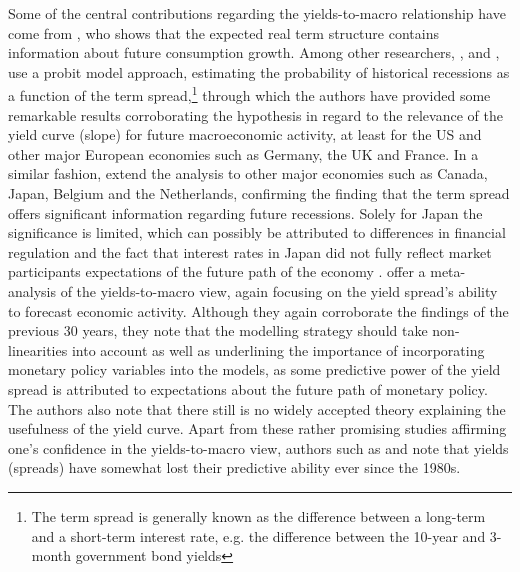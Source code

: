 Some of the central contributions regarding the yields-to-macro relationship have come from \citet{harvey1988real}, who shows that the expected real term structure contains information about future consumption growth.
Among other researchers, \citet{estrella1991term}, \citet{estrella1995term} and \citet{estrella1996yield}, use a probit model approach, estimating the probability of historical recessions as a function of the term spread,\footnote{The term spread is generally known as the difference between a long-term and a short-term interest rate, e.g. the difference between the 10-year and 3-month government bond yields} through which the authors have provided some remarkable results corroborating the hypothesis in regard to the relevance of the yield curve (slope) for future macroeconomic activity, at least for the US and other major European economies such as Germany, the UK and France.
In a similar fashion, \citet{bernard1996} extend the analysis to other major economies such as Canada, Japan, Belgium and the Netherlands, confirming the finding that the term spread offers significant information regarding future recessions. 
Solely for Japan the significance is limited, which can possibly be attributed to differences in financial regulation and the fact that interest rates in Japan did not fully reflect market participants expectations of the future path of the economy \citep{bernard1996}. 
\citet{evgenidis2018yield} offer a meta-analysis of the yields-to-macro view, again focusing on the yield spread's ability to forecast economic activity. Although they again corroborate the findings of the previous 30 years, they note that the modelling strategy should take non-linearities into account as well as underlining the importance of incorporating monetary policy variables into the models, as some predictive power of the yield spread is attributed to expectations about the future path of monetary policy. The authors also note that there still is no widely accepted theory explaining the usefulness of the yield curve. 
Apart from these rather promising studies affirming one's confidence in the yields-to-macro view, authors such as \citet{dotsey1998predictive} and \citet{stock_watson_2001} note that yields (spreads) have somewhat lost their predictive ability ever since the 1980s. 

